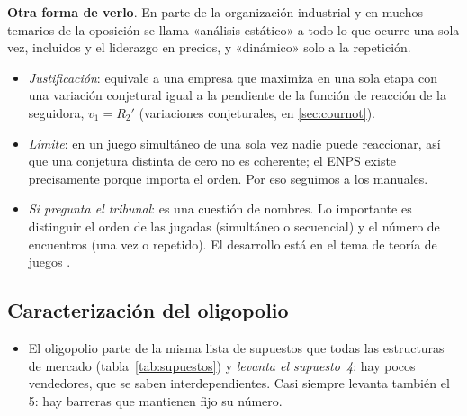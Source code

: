 \documentclass[11pt]{article}
\begin{document}
\begin{anotaciones}
\textbf{Otra forma de verlo}. En parte de la organización industrial y en muchos temarios de la oposición se llama «análisis estático» a todo lo que ocurre una sola vez, incluidos  y el liderazgo en precios, y «dinámico» solo a la repetición.
\begin{itemize}
\item \emph{Justificación}:  equivale a una empresa que maximiza en una sola etapa con una variación conjetural igual a la pendiente de la función de reacción de la seguidora, $v_1=R_2'$ (variaciones conjeturales, en \ref{sec:cournot}).
\item \emph{Límite}: en un juego simultáneo de una sola vez nadie puede reaccionar, así que una conjetura distinta de cero no es coherente\nocite{Tirole1988Theory}; el ENPS existe precisamente porque importa el orden. Por eso seguimos a los manuales.
\item \emph{Si pregunta el tribunal}: es una cuestión de nombres. Lo importante es distinguir el orden de las jugadas (simultáneo o secuencial) y el número de encuentros (una vez o repetido). El desarrollo está en el tema de teoría de juegos .
\end{itemize}
\end{anotaciones}

\subsection{Caracterización del oligopolio}\label{sec:caracterizacion-oligopolio}

\begin{itemize}
\item El oligopolio parte de la misma lista de supuestos que todas las estructuras de mercado (tabla~\ref{tab:supuestos})  y \emph{levanta el supuesto~4}: hay pocos vendedores, que se saben interdependientes. Casi siempre levanta también el 5: hay barreras que mantienen fijo su número.
\end{itemize}
\end{document}
